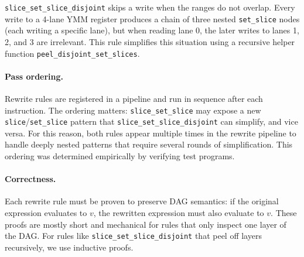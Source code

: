 \texttt{slice\_set\_slice\_disjoint} skips a write when the ranges do not overlap.
Every write to a 4-lane YMM register produces a chain of three nested \texttt{set\_slice} nodes (each writing a specific lane), but when reading lane 0, the later writes to lanes 1, 2, and 3 are irrelevant. This rule simplifies this situation using a recursive helper function \texttt{peel\_disjoint\_set\_slices}.




\paragraph{Pass ordering.}
Rewrite rules are registered in a pipeline and run in sequence after each instruction.
The ordering matters: \texttt{slice\_set\_slice} may expose a new \texttt{slice}/\texttt{set\_slice} pattern that \texttt{slice\_set\_slice\_disjoint} can simplify, and vice versa.
For this reason, both rules appear multiple times in the rewrite pipeline to handle deeply nested patterns that require several rounds of simplification. This ordering was determined empirically by verifying test programs.

\paragraph{Correctness.}
Each rewrite rule must be proven to preserve DAG semantics: if the original expression evaluates to $v$, the rewritten expression must also evaluate to $v$.
These proofs are mostly short and mechanical for rules that only inspect one layer of the DAG. For rules like \texttt{slice\_set\_slice\_disjoint} that peel off layers recursively, we use inductive proofs.


